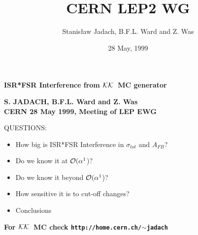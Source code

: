 \documentclass[dvips,portrait]{cernsem}             %
\title{ CERN LEP2 WG}
\author{Stanis\l{}aw Jadach, B.F.L. Ward and Z. Was}
\date{\small 28 May, 1999}
\def\Order#1{${\cal O}(#1$)}
\newcommand{\KK}{${\cal KK}$}
\begin{document}



\begin{Slide}{{\bf\color{red} ISR*FSR Interference from \KK\ MC generator }}


\begin{center}
{\bf\color{Black} S. JADACH, B.F.L. Ward and  Z. Was\\
CERN 28 May 1999, Meeting of LEP EWG}
\end{center}

\vspace{5mm}
QUESTIONS:
{\bf\color{blue}
  \begin{itemize}
  \item
    How big is ISR*FSR Interference in $\sigma_{tot}$ and $A_{FB}$?
  \item
    Do we know it at \Order{\alpha^1}?
  \item
    Do we know it beyond \Order{\alpha^1}?
  \item
    How sensitive it is to cut-off changes?
  \item
    Conclusions
  \end{itemize}
}

{\bf\color{Magenta}  For \KK\ MC check {\tt http://home.cern.ch/$\sim$jadach}}
\end{Slide}                               %
\end{document}
